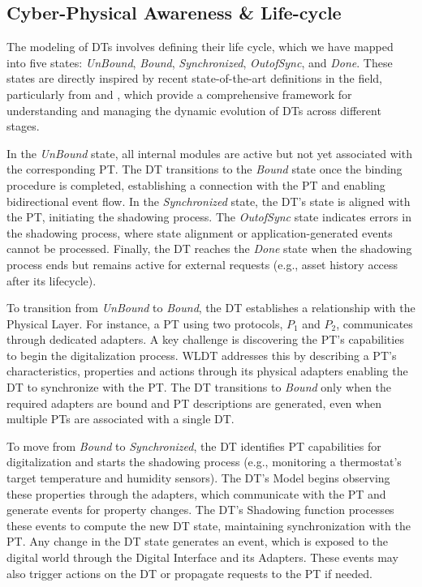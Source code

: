 \subsection{Cyber-Physical Awareness \& Life-cycle}
\label{sec:dt-lifecycle}

The modeling of DTs involves defining their life cycle, which we have mapped into five states: \textit{UnBound}, \textit{Bound}, \textit{Synchronized}, \textit{OutofSync}, and \textit{Done}.
These states are directly inspired by recent state-of-the-art definitions in the field, particularly from \cite{web_of_dt} and \cite{bellavista2023requirements}, which provide a comprehensive framework for understanding and managing the dynamic evolution of DTs across different stages.

In the \textit{UnBound} state, all internal modules are active but not yet associated with the corresponding PT.
The DT transitions to the \textit{Bound} state once the binding procedure is completed, establishing a connection with the PT and enabling bidirectional event flow.
In the \textit{Synchronized} state, the DT’s state is aligned with the PT, initiating the shadowing process.
The \textit{OutofSync} state indicates errors in the shadowing process, where state alignment or application-generated events cannot be processed.
Finally, the DT reaches the \textit{Done} state when the shadowing process ends but remains active for external requests (e.g., asset history access after its lifecycle).

To transition from \textit{UnBound} to \textit{Bound}, the DT establishes a relationship with the Physical Layer.
For instance, a PT using two protocols, $P_1$ and $P_2$, communicates through dedicated adapters.
A key challenge is discovering the PT’s capabilities to begin the digitalization process. WLDT addresses this by describing a PT’s characteristics, properties and actions through its physical adapters enabling the DT to synchronize with the PT.
The DT transitions to \textit{Bound} only when the required adapters are bound and PT descriptions are generated, even when multiple PTs are associated with a single DT.

To move from \textit{Bound} to \textit{Synchronized}, the DT identifies PT capabilities for digitalization and starts the shadowing process (e.g., monitoring a thermostat's target temperature and humidity sensors).
The DT’s Model begins observing these properties through the adapters, which communicate with the PT and generate events for property changes.
The DT’s Shadowing function processes these events to compute the new DT state, maintaining synchronization with the PT.
Any change in the DT state generates an event, which is exposed to the digital world through the Digital Interface and its Adapters.
These events may also trigger actions on the DT or propagate requests to the PT if needed.

